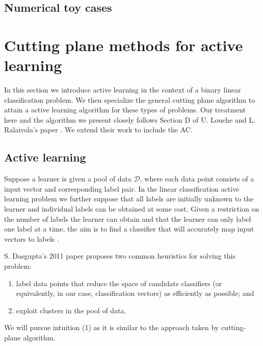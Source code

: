 \documentclass[11pt]{amsart}
\theoremstyle{definition}
\theoremstyle{remark}
\begin{document}
        \subsection{Numerical toy cases}


\section{Cutting plane methods for active learning}\label{s:cp_active}
    In this section we introduce active learning in the context of a binary linear classification problem. We then specialize the general cutting plane algorithm to attain a active learning algorithm for these types of problems. Our treatment here and the algorithm we present closely follows Section D of U. Louche and L. Ralaivola's paper \cite{LR15}. We extend their work to include the AC.

    \subsection{Active learning}\label{ss:active}
        Suppose a learner is given a pool of data $\mathcal{D}$, where each data point consists of a input vector and corresponding label pair. In the linear classification active learning problem we further suppose that all labels are initially unknown to the learner and individual labels can be obtained at some cost. Given a restriction on the number of labels the learner can obtain and that the learner can only label one label at a time, the aim is to find a classifier that will accurately map input vectors to labels \cite{Das11}. 

        S. Dasgupta's 2011 paper \cite{Das11} proposes two common heuristics for solving this problem:
        \begin{enumerate}
            \item label data points that reduce the space of candidate classifiers (or equivalently, in our case, classification vectors) as efficiently as possible; and
            \item exploit clusters in the pool of data.
        \end{enumerate}   
        We will pursue intuition (1) as it is similar to the approach taken by cutting-plane algorithm. 
\end{document}
